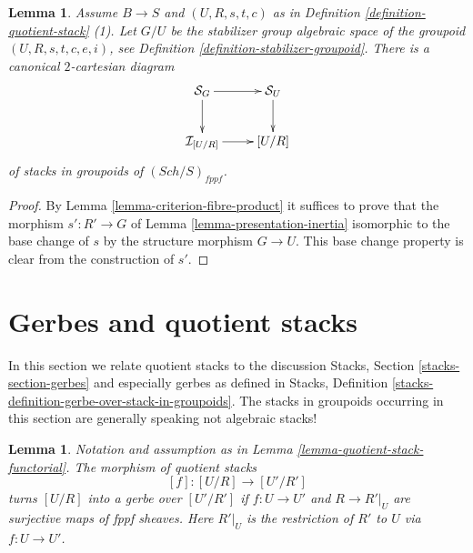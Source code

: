 \documentclass{stacks-project}
\theoremstyle{plain}
\newtheorem{lemma}[subsection]{Lemma}
\theoremstyle{definition}
\theoremstyle{remark}
\numberwithin{equation}{subsection}
\def\Sch{\mathit{Sch}}
\begin{document}
\begin{lemma}
\label{lemma-2-cartesian-inertia}
Assume $B \to S$ and $(U, R, s, t, c)$ as in
Definition \ref{definition-quotient-stack} (1).
Let $G/U$ be the stabilizer group algebraic space of the groupoid
$(U, R, s, t, c, e, i)$, see
Definition \ref{definition-stabilizer-groupoid}.
There is a canonical $2$-cartesian diagram
$$
\xymatrix{
\mathcal{S}_G \ar[r] \ar[d] & \mathcal{S}_U \ar[d] \\
\mathcal{I}_{[U/R]} \ar[r] & [U/R]
}
$$
of stacks in groupoids of $(\Sch/S)_{fppf}$.
\end{lemma}

\begin{proof}
By
Lemma \ref{lemma-criterion-fibre-product}
it suffices to prove that the morphism
$s' : R' \to G$ of
Lemma \ref{lemma-presentation-inertia}
isomorphic to the base change of $s$ by the structure
morphism $G \to U$. This base change property is
clear from the construction of $s'$.
\end{proof}







\section{Gerbes and quotient stacks}
\label{section-gerbes}

\noindent
In this section we relate quotient stacks to the discussion
Stacks, Section \ref{stacks-section-gerbes}
and especially gerbes as defined in
Stacks, Definition \ref{stacks-definition-gerbe-over-stack-in-groupoids}.
The stacks in groupoids occurring in this section
are generally speaking not algebraic stacks!

\begin{lemma}
\label{lemma-when-gerbe}
Notation and assumption as in
Lemma \ref{lemma-quotient-stack-functorial}.
The morphism of quotient stacks
$$
[f] : [U/R] \longrightarrow [U'/R']
$$
turns $[U/R]$ into a gerbe over $[U'/R']$ if $f : U \to U'$ and
$R \to R'|_U$ are surjective maps of fppf sheaves. Here $R'|_U$ is
the restriction of $R'$ to $U$ via $f : U \to U'$.
\end{lemma}
\end{document}
